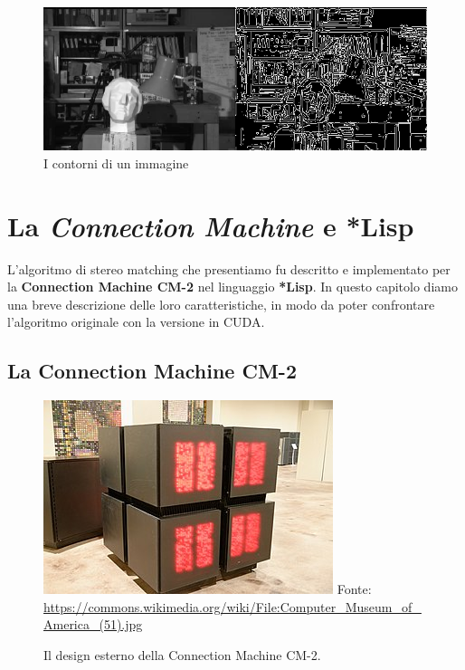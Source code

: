 \documentclass[12pt,a4paper,openright,twoside]{report}
\begin{document}
\begin{figure}[h]
    \centering
    \includegraphics[width=\textwidth]{contours.png}
    \caption{I contorni di un immagine}
    \label{img:contours}
\end{figure}




\chapter{La \textit{Connection Machine} e *Lisp}

L'algoritmo di stereo matching che presentiamo fu descritto e implementato per la \textbf{Connection Machine CM-2} nel linguaggio \textbf{*Lisp}. In questo capitolo diamo una breve descrizione delle loro caratteristiche, in modo da poter confrontare l'algoritmo originale con la versione in CUDA.

\section{La Connection Machine CM-2}

\begin{figure}[h]
    \centering
    \def\stackalignment{r}
    \stackunder
        {\includegraphics[width=\textwidth]{connection-machine.jpg}}
        {\scriptsize Fonte: \url{https://commons.wikimedia.org/wiki/File:Computer_Museum_of_America_(51).jpg}}
    \caption{Il design esterno della Connection Machine CM-2.}
    \label{img:connection_machine}
\end{figure}
\end{document}
